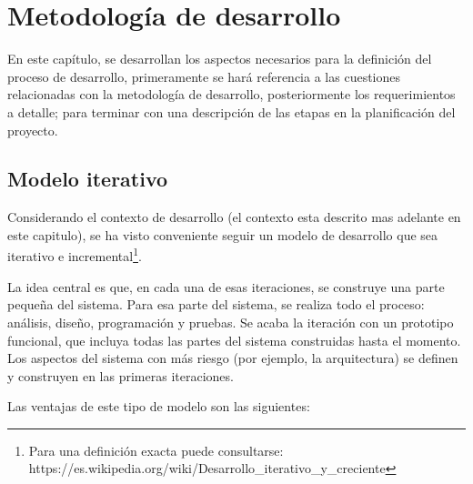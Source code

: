 \chapter{Metodología de desarrollo}

En este capítulo, se desarrollan los aspectos necesarios para la definición del 
proceso de desarrollo, primeramente se hará referencia a las cuestiones 
relacionadas con la metodología de desarrollo, posteriormente los requerimientos
a detalle; para terminar con una descripción de las etapas en la planificación
del proyecto.

\section{Modelo iterativo}

Considerando el contexto de desarrollo (el contexto esta descrito mas adelante
en este capitulo), se ha visto conveniente seguir un modelo de desarrollo que
sea iterativo e incremental\footnote{Para una definición exacta puede
consultarse: https://es.wikipedia.org/wiki/Desarrollo\_iterativo\_y\_creciente}.

La idea central es que, en cada una de esas iteraciones, se construye una parte
pequeña del sistema. Para esa parte del sistema, se realiza todo el proceso:
análisis, diseño, programación y pruebas. Se acaba la iteración con un
prototipo funcional, que incluya todas las partes del sistema construidas hasta
el momento. Los aspectos del sistema con más riesgo (por ejemplo, la
arquitectura) se definen y construyen en las primeras iteraciones.

Las ventajas de este tipo de modelo son las siguientes:

